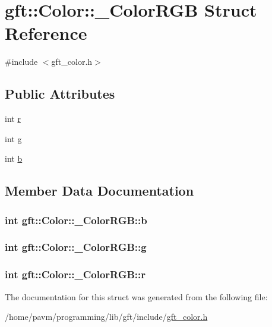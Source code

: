 \hypertarget{structgft_1_1Color_1_1__ColorRGB}{\section{gft\-:\-:Color\-:\-:\-\_\-\-Color\-R\-G\-B Struct Reference}
\label{structgft_1_1Color_1_1__ColorRGB}
}


{\ttfamily \#include $<$gft\-\_\-color.\-h$>$}

\subsection*{Public Attributes}
\begin{DoxyCompactItemize}
\item 
int \hyperlink{structgft_1_1Color_1_1__ColorRGB_aef66edd58713d34d554205dd8fb636ad}{r}
\item 
int \hyperlink{structgft_1_1Color_1_1__ColorRGB_a2b271c9a718bd0b4c77d857b3e6218e5}{g}
\item 
int \hyperlink{structgft_1_1Color_1_1__ColorRGB_ac3cabaf6b8214ec517001ec1eb7f250a}{b}
\end{DoxyCompactItemize}


\subsection{Member Data Documentation}
\hypertarget{structgft_1_1Color_1_1__ColorRGB_ac3cabaf6b8214ec517001ec1eb7f250a}{
\subsubsection[{b}]{\setlength{\rightskip}{0pt plus 5cm}int gft\-::\-Color\-::\-\_\-\-Color\-R\-G\-B\-::b}}\label{structgft_1_1Color_1_1__ColorRGB_ac3cabaf6b8214ec517001ec1eb7f250a}
\hypertarget{structgft_1_1Color_1_1__ColorRGB_a2b271c9a718bd0b4c77d857b3e6218e5}{
\subsubsection[{g}]{\setlength{\rightskip}{0pt plus 5cm}int gft\-::\-Color\-::\-\_\-\-Color\-R\-G\-B\-::g}}\label{structgft_1_1Color_1_1__ColorRGB_a2b271c9a718bd0b4c77d857b3e6218e5}
\hypertarget{structgft_1_1Color_1_1__ColorRGB_aef66edd58713d34d554205dd8fb636ad}{
\subsubsection[{r}]{\setlength{\rightskip}{0pt plus 5cm}int gft\-::\-Color\-::\-\_\-\-Color\-R\-G\-B\-::r}}\label{structgft_1_1Color_1_1__ColorRGB_aef66edd58713d34d554205dd8fb636ad}


The documentation for this struct was generated from the following file\-:\begin{DoxyCompactItemize}
\item 
/home/pavm/programming/lib/gft/include/\hyperlink{gft__color_8h}{gft\-\_\-color.\-h}\end{DoxyCompactItemize}
